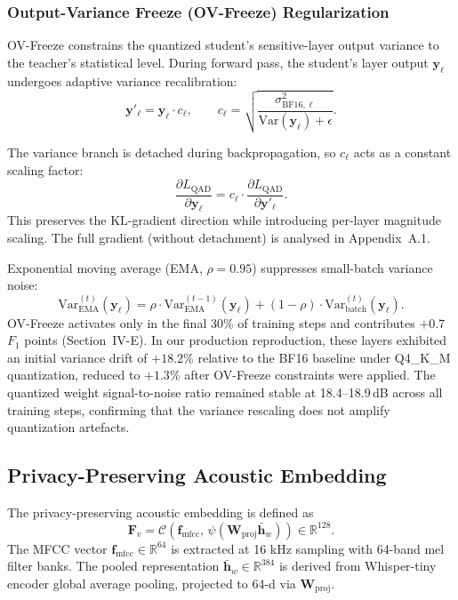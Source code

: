 \documentclass[final,5p,times,number]{elsarticle}
\begin{document}
\subsubsection{Output-Variance Freeze (OV-Freeze) Regularization}

OV-Freeze constrains the quantized student's sensitive-layer output variance to the teacher's statistical level. During forward pass, the student's layer output $\bm{y}_\ell$ undergoes adaptive variance recalibration:
\begin{equation}
\label{eq:ovf-rescale-en}
\bm{y}'_\ell = \bm{y}_\ell\cdot c_\ell, \qquad c_\ell = \sqrt{\frac{\sigma^2_{\mathrm{BF16},\ell}}{\mathrm{Var}(\bm{y}_\ell) + \epsilon}}.
\end{equation}

The variance branch is detached during backpropagation, so $c_\ell$ acts as a constant scaling factor:
\begin{equation}
\label{eq:ovf-detach-en}
\frac{\partial L_{\mathrm{QAD}}}{\partial\bm{y}_\ell} = c_\ell\cdot\frac{\partial L_{\mathrm{QAD}}}{\partial\bm{y}'_\ell}.
\end{equation}
This preserves the KL-gradient direction while introducing per-layer magnitude scaling. The full gradient (without detachment) is analysed in Appendix~A.1.

Exponential moving average (EMA, $\rho = 0.95$) suppresses small-batch variance noise:
\begin{equation}
\label{eq:ema}
\mathrm{Var}^{(t)}_{\mathrm{EMA}}(\bm{y}_\ell) = \rho\cdot\mathrm{Var}^{(t-1)}_{\mathrm{EMA}}(\bm{y}_\ell) + (1-\rho)\cdot\mathrm{Var}^{(t)}_{\mathrm{batch}}(\bm{y}_\ell).
\end{equation}
OV-Freeze activates only in the final 30\% of training steps and contributes $+0.7$ $F_1$ points (Section~IV-E). In our production reproduction, these layers exhibited an initial variance drift of $+18.2\%$ relative to the BF16 baseline under Q4\_K\_M quantization, reduced to $+1.3\%$ after OV-Freeze constraints were applied. The quantized weight signal-to-noise ratio remained stable at 18.4--18.9\,dB across all training steps, confirming that the variance rescaling does not amplify quantization artefacts.

\subsection{Privacy-Preserving Acoustic Embedding}

The privacy-preserving acoustic embedding is defined as
\begin{equation}
\label{eq:f-v}
\bm{F}_v = \mathcal{C}\!\left(\bm{f}_{\mathrm{mfcc}},\,\psi(\bm{W}_{\mathrm{proj}}\bar{\bm{h}}_w)\right)\in\mathbb{R}^{128}.
\end{equation}
The MFCC vector $\bm{f}_{\mathrm{mfcc}}\in\mathbb{R}^{64}$ is extracted at 16 kHz sampling with 64-band mel filter banks. The pooled representation $\bar{\bm{h}}_w\in\mathbb{R}^{384}$ is derived from Whisper-tiny encoder global average pooling, projected to 64-d via $\bm{W}_{\mathrm{proj}}$.
\end{document}
